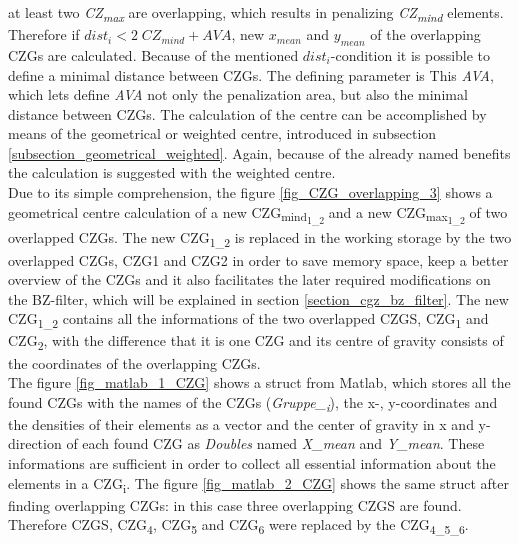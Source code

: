 at least two \textit{CZ\textsubscript{max}} are overlapping,
which results in penalizing \textit{CZ\textsubscript{mind}} elements. Therefore if
$dist_i < 2 \; CZ_{mind} +AVA$,
new $x_{mean}$ and $y_{mean}$ of the overlapping CZGs are calculated.
Because of the mentioned $dist_i$-condition
it is possible to define a minimal distance
between CZGs. The defining parameter is 
  This \emph{AVA}, which lets define
  \emph{AVA} not only the penalization area,
  but also the minimal distance between CZGs.
  The calculation of the centre
can be accomplished by means of the geometrical or weighted centre,
 introduced in subsection \ref{subsection_geometrical_weighted}.
Again, because of the already 
named benefits the calculation is suggested with the weighted centre.\\

Due to its simple comprehension, the figure 
\ref{fig_CZG_overlapping_3} shows a geometrical centre calculation of a new
CZG\textsubscript{mind\textsubscript{1\_2}} and a
 new CZG\textsubscript{max\textsubscript{1\_2}} of two overlapped CZGs. The new CZG\textsubscript{1\_2} is replaced in the
working storage by the two overlapped CZGs,
CZG1 and CZG2 in order to save memory space,
keep a better overview of the CZGs and it also facilitates the later required modifications on the
BZ-filter, which will be explained in section 
\ref{section_cgz_bz_filter}.
 The new CZG\textsubscript{1\_2} contains all the informations
of the two overlapped CZGS, CZG\textsubscript{1}
 and CZG\textsubscript{2}, with the difference that it is one CZG and its centre
of gravity consists of the coordinates of the overlapping CZGs. \\

The figure \ref{fig_matlab_1_CZG} shows a struct from
Matlab, which stores all the found CZGs with
 the names of the CZGs (\textit{Gruppe\_\textsubscript{i}}),
  the x-, y-coordinates and 
 the densities of their elements as a vector and the center 
of gravity in x and y-direction of each found CZG as \emph{Doubles}
named \textit{X\_mean}
and \textit{Y\_mean}. These informations are sufficient in order to
collect all essential information about the elements
in a CZG\textsubscript{i}. The figure \ref{fig_matlab_2_CZG} shows
the same struct after finding overlapping CZGs: in this case
three overlapping CZGS are found. Therefore CZGS, CZG\textsubscript{4},
CZG\textsubscript{5} and CZG\textsubscript{6} were replaced by the 
CZG\textsubscript{4\_5\_6}.

